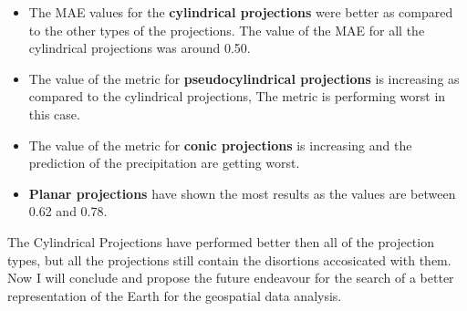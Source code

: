 \begin{itemize}
    \item The MAE values for the \textbf{cylindrical projections} were better as compared to the other types of the projections.
          The value of the MAE for all the cylindrical projections was around 0.50.
    \item The value of the metric for \textbf{pseudocylindrical projections} is increasing as compared to the cylindrical projections, The metric is performing worst in this case.
    \item The value of the metric for \textbf{conic projections} is increasing and the prediction of the precipitation are getting worst.
    \item \textbf{Planar projections} have shown the most results as the values are between 0.62 and 0.78.
\end{itemize}

The Cylindrical Projections have performed better then all of the projection types,
but all the projections still contain the disortions accosicated with them.
Now I will conclude and propose the future endeavour for the search of a better representation of the Earth for the geospatial data analysis.